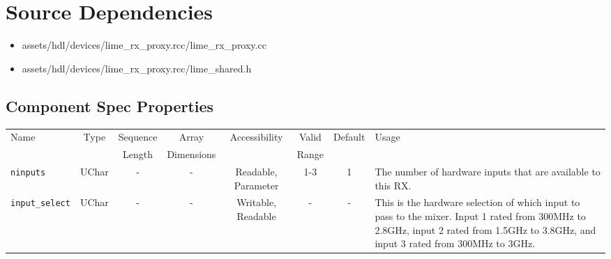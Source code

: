 \documentclass{article}
\begin{document}
\section*{Source Dependencies}
\begin{itemize}
	\item assets/hdl/devices/lime\_rx\_proxy.rcc/lime\_rx\_proxy.cc
	\item assets/hdl/devices/lime\_rx\_proxy.rcc/lime\_shared.h
\end{itemize}

\begin{landscape}
	\section*{Component Spec Properties}
	\begin{scriptsize}
		\begin{tabular}{|p{3cm}|c|c|c|c|c|c|p{10cm}|}
			\hline
			\rowcolor{blue}
			Name                          & Type   & Sequence & Array      & Accessibility       & Valid & Default & Usage                                                                                                                                                                                                                                                              \\
			\rowcolor{blue}
			                              &        & Length   & Dimensions &                     & Range &         &                                                                                                                                                                                                                                                                    \\
			\hline
			\verb+ninputs+                & UChar  & -        & -          & Readable, Parameter & 1-3   & 1       & The number of hardware inputs that are available to this RX.                                                                                                                                                                                                       \\
			\hline
			\verb+input_select+           & UChar  & -        & -          & Writable, Readable  & -     & -       & This is the hardware selection of which input to pass to the mixer. Input 1 rated from 300MHz to 2.8GHz, input 2 rated from 1.5GHz to 3.8GHz, and input 3 rated from 300MHz to 3GHz.                                                                               \\

\end{tabular}
\end{scriptsize}
\end{landscape}
\end{document}
